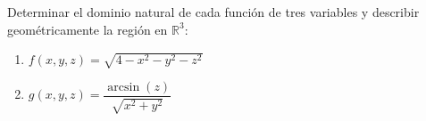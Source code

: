 Determinar el dominio natural de cada función de tres variables y describir geométricamente la región en $\mathbb{R}^3$:
\begin{enumerate}
    \item $f(x,y,z) = \sqrt{4 - x^2 - y^2 - z^2}$
    \item $g(x,y,z) = \dfrac{\arcsin(z)}{\sqrt{x^2 + y^2}}$
\end{enumerate}